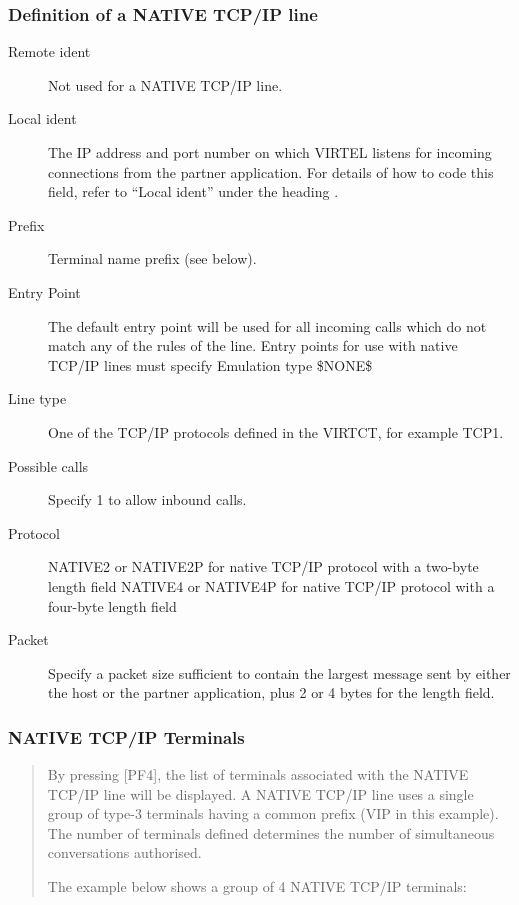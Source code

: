 \documentclass[letterpaper,10pt,english]{sphinxmanual}
\begin{document}


\subsubsection{Definition of a NATIVE TCP/IP line}
\label{\detokenize{connectivity_guide:definition-of-a-native-tcp-ip-line}}\begin{description}
\item[{Remote ident}] \leavevmode
Not used for a NATIVE TCP/IP line.

\item[{Local ident}] \leavevmode
The IP address and port number on which VIRTEL listens for incoming connections from the partner application. For details of how to code this field, refer to “Local ident” under the heading {\hyperref[\detokenize{connectivity_guide:bookmark13}]{}}.

\item[{Prefix}] \leavevmode
Terminal name prefix (see below).

\item[{Entry Point}] \leavevmode
The default entry point will be used for all incoming calls which do not match any of the rules of the line. Entry points for use with native TCP/IP lines must specify Emulation type \$NONE\$

\item[{Line type}] \leavevmode
One of the TCP/IP protocols defined in the VIRTCT, for example TCP1.

\item[{Possible calls}] \leavevmode
Specify 1 to allow inbound calls.

\item[{Protocol}] \leavevmode
NATIVE2 or NATIVE2P for native TCP/IP protocol with a two-byte length field NATIVE4 or NATIVE4P for native TCP/IP protocol with a four-byte length field

\item[{Packet}] \leavevmode
Specify a packet size sufficient to contain the largest message sent by either the host or the partner application, plus 2 or 4 bytes for the length field.

\end{description}


\subsubsection{NATIVE TCP/IP Terminals}
\label{\detokenize{connectivity_guide:native-tcp-ip-terminals}}\begin{quote}

By pressing {[}PF4{]}, the list of terminals associated with the NATIVE TCP/IP line will be displayed. A NATIVE TCP/IP line uses a single group of type-3 terminals having a common prefix (VIP in this example). The number of terminals defined determines the number of simultaneous conversations authorised.

The example below shows a group of 4 NATIVE TCP/IP terminals:
\end{quote}
\end{document}
